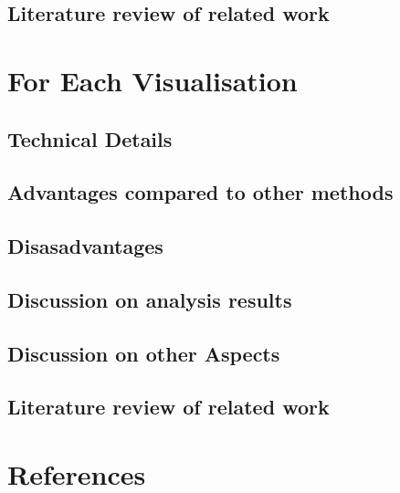 \documentclass[11pt]{article}
\begin{document}
\subsection{Literature review of related work}
\label{sec:orged132ee}

\section{For Each Visualisation}
\label{sec:org12d11b8}

\subsection{Technical Details}
\label{sec:org0d9140c}
\subsection{Advantages compared to other methods}
\label{sec:org992d220}
\subsection{Disasadvantages}
\label{sec:orgbc36f7f}
\subsection{Discussion on analysis results}
\label{sec:org2de2d93}
\subsection{Discussion on other Aspects}
\label{sec:org05f63f6}
\subsection{Literature review of related work}
\label{sec:orgdcaf953}

\section{References}
\label{sec:orged456ea}
\label{org98acb60}


\label{org0b1333d}
 
\end{document}
